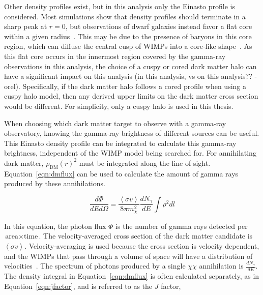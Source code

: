     Other density profiles exist, but in this analysis only the Einasto profile is considered.
    Most simulations show that density profiles should terminate in a sharp peak at $r=0$, but observations of dwarf galaxies instead favor a flat core within a given radius~\cite{flores1994observational,CoreVsCusp}.
    This may be due to the presence of baryons in this core region, which can diffuse the central cusp of WIMPs into a core-like shape~\cite{corecusp_baryondiffuse1,corecusp_baryondiffuse2}.
    As this flat core occurs in the innermost region covered by the gamma-ray observations {\color{red}in this analysis}, the choice of a cuspy or cored dark matter halo can have a significant impact {\color{red}on this analysis} {\color{red}(in this analysis, vs on this analysis?? -orel)}.
    Specifically, if the dark matter halo follows a cored profile when using a cuspy halo model, then any derived upper limits on the dark matter cross section would be different.
    For simplicity, only a cuspy halo is used in this thesis.
    
    When choosing which dark matter target to observe with a gamma-ray observatory, knowing the gamma-ray brightness of different sources can be useful.
    This Einasto density profile can be integrated to calculate this gamma-ray brightness, independent of the WIMP model being searched for.
    For annihilating dark matter, $\rho_{\textrm{DM}}\left(r\right)^2$ must be integrated along the line of sight.
    Equation~\ref{eqn:dmflux} can be used to calculate the amount of gamma rays produced by these annihilations.
    
    \begin{equation}\label{eqn:dmflux}
      \frac{ d\Phi }{ dE d \Omega } = \frac{ \left \langle \sigma v \right \rangle }{8 \pi m_\chi^2} \frac{dN_{\gamma}}{dE} \int \rho^2 dl
    \end{equation}
    
    In this equation, the photon flux $\Phi$ is the number of gamma rays detected per $\textrm{area}\times\textrm{time}$.
    The velocity-averaged cross section of the dark matter candidate is $\left \langle \sigma v \right \rangle$.
    Velocity-averaging is used because the cross section is velocity dependent, and the WIMPs that pass through a volume of space will have a distribution of velocities~\cite{wimp_veldist}.
    The spectrum of photons produced by a single $\chi\chi$ annihilation is $\frac{dN_{\gamma}}{dE}$.
    The density integral in Equation~\ref{eqn:dmflux} is often calculated separately, as in Equation~\ref{eqn:jfactor}, and is referred to as the $J$ factor,

